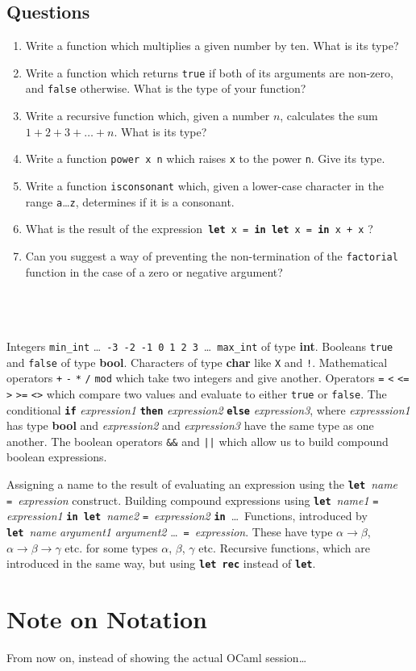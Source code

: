 \documentclass[]{book}
\newcommand\upquote[1]{\textquotesingle#1\textquotesingle}
\newcommand{\sofarstartingoff}{

\noindent 1

\noindent Integers \texttt{min\_int} \ldots\ \texttt{-3}\ \texttt{-2}\ \texttt{-1}\ \texttt{0}\ \texttt{1}\ \texttt{2}\ \texttt{3}\ \ldots\ \texttt{max\_int} of type \textbf{\textrm{int}}. Booleans \texttt{true} and \texttt{false} of type \textbf{\textrm{bool}}. \noindent Characters of type \textrm{\textbf{char}} like \texttt{\upquote{X}} and \texttt{\upquote{!}}. Mathematical operators \texttt{+} \texttt{-} \texttt{*} \texttt{/} \texttt{mod} which take two integers and give another. Operators \texttt{=} \texttt{<} \texttt{<=} \texttt{>} \texttt{>=} \texttt{<>} which compare two values and evaluate to either \texttt{true} or \texttt{false}. The conditional \textbf{\texttt{if}} \textit{expression1} \textbf{\texttt{then}} \textit{expression2} \textbf{\texttt{else}} \textit{expression3}, where \textit{expresssion1} has type \textrm{\textbf{bool}} and \textit{expression2} and \textit{expression3} have the same type as one another. The boolean operators \texttt{\&\&} and \texttt{||} which allow us to build compound boolean expressions.}
\newcommand{\sofarfunctions}
{
\noindent 2

\noindent Assigning a name to the result of evaluating an expression using the \textbf{\texttt{let}}\ \textit{name} \texttt{=}\ \textit{expression} construct. Building compound expressions using \textbf{\texttt{let}}\ \textit{name1} \texttt{=} \textit{expression1} \textbf{\texttt{in}}\ \textbf{\texttt{let}}\ \textit{name2} \texttt{=}\ \textit{expression2} \textbf{\texttt{in}}\ \ldots \ Functions, introduced by \textbf{\texttt{let}}\ \textit{name} \textit{argument1} \textit{argument2} \ldots\ \texttt{=}\ \textit{expression}. These have type $\alpha \rightarrow \beta$, $\alpha \rightarrow \beta \rightarrow \gamma$ etc. for some types $\alpha$, $\beta$, $\gamma$ etc. Recursive functions, which are introduced in the same way, but using \textbf{\texttt{let rec}} instead of \textbf{\texttt{let}}.}
\begin{document}
\clearpage
\section*{Questions}

\begin{enumerate}
 \item Write a function which multiplies a given number by ten. What is its type?
 \item Write a function which returns \texttt{true} if both of its arguments are non-zero, and \texttt{false} otherwise. What is the type of your function?
 \item Write a recursive function which, given a number $n$, calculates the sum $1 + 2 + 3 + \ldots + n$. What is its type?
 \item Write a function \texttt{power\! x\! n} which raises \texttt{x} to the power \texttt{n}. Give its type.
 \item Write a function \texttt{isconsonant} which, given a lower-case character in the range \texttt{\upquote{a}}\ldots\texttt{\upquote{z}}, determines if it is a consonant.
 \item What is the result of the expression\, \texttt{\textbf{let}\! x\! =\! \textbf{in}\! \textbf{let}\! x\! =\! \textbf{in}\! x\! +\! x} ?
 \item Can you suggest a way of preventing the non-termination of the \texttt{factorial} function in the case of a zero or negative argument?
\end{enumerate}

\cleardoublepage
\pagestyle{empty}
\chapter*{}
\\

{\footnotesize
\sofarstartingoff

\vspace{\baselineskip}
\sofarfunctions
}

\pagestyle{empty}

\chapter*{Note on Notation}

From now on, instead of showing the actual OCaml session\ldots
\end{document}
